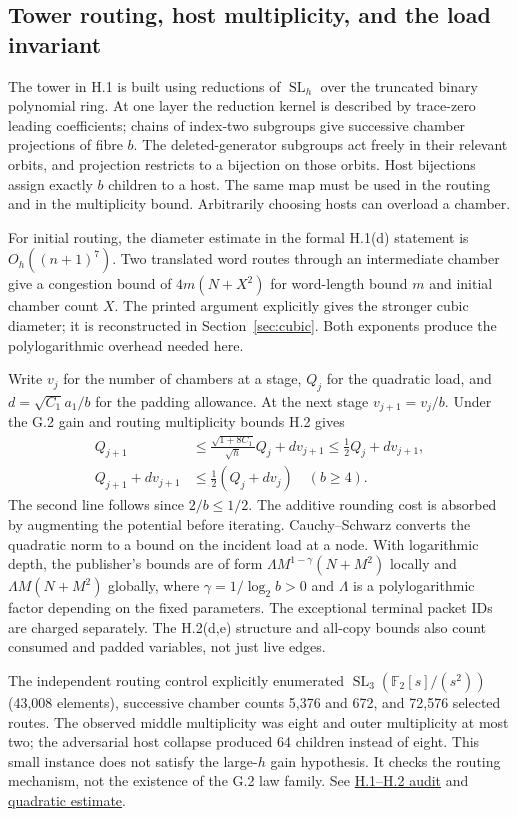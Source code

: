\documentclass[11pt,letterpaper]{article}
\theoremstyle{definition}\newtheorem{definition}[theorem]{Definition}\newtheorem{example}[theorem]{Example}
\theoremstyle{remark}\newtheorem{remark}[theorem]{Remark}
\newcommand{\F}{\mathbb{F}}
\newcommand{\pub}[3]{\href{https://github.com/anthropics/formal-math/blob/11b6c7e3c927df2658f513b6b68ea7f8929c62c5/vp-vnp/#1\#L#2}{#3}}
\newcommand{\aud}[2]{\href{https://github.com/nousentllc/VP-VNP-Review/blob/567303d0bcf4f9d54390437b137752446e58ccd6/#1}{#2}}
\begin{document}
\subsection{Tower routing, host multiplicity, and the load invariant}\label{sec:tower}
The tower in H.1 is built using reductions of $\operatorname{SL}_h$ over the truncated binary polynomial ring. At one layer the reduction kernel is described by trace-zero leading coefficients; chains of index-two subgroups give successive chamber projections of fibre $b$. The deleted-generator subgroups act freely in their relevant orbits, and projection restricts to a bijection on those orbits. Host bijections assign exactly $b$ children to a host. The same map must be used in the routing and in the multiplicity bound. Arbitrarily choosing hosts can overload a chamber.

For initial routing, the diameter estimate in the formal H.1(d) statement is $O_h((n+1)^7)$. Two translated word routes through an intermediate chamber give a congestion bound of $4m(N+X^2)$ for word-length bound $m$ and initial chamber count $X$. The printed argument explicitly gives the stronger cubic diameter; it is reconstructed in Section~\ref{sec:cubic}. Both exponents produce the polylogarithmic overhead needed here.

Write $v_j$ for the number of chambers at a stage, $Q_j$ for the quadratic load, and $d=\sqrt{C_1}a_1/b$ for the padding allowance. At the next stage $v_{j+1}=v_j/b$. Under the G.2 gain and routing multiplicity bounds H.2 gives
\begin{align}
 Q_{j+1}&\le \frac{\sqrt{1+8C_1}}{\sqrt h}Q_j+d v_{j+1}\le\tfrac12Q_j+d v_{j+1},\\
 Q_{j+1}+dv_{j+1}&\le\tfrac12(Q_j+dv_j)\quad(b\ge4).\label{eq:load}
\end{align}
The second line follows since $2/b\le1/2$. The additive rounding cost is absorbed by augmenting the potential before iterating. Cauchy--Schwarz converts the quadratic norm to a bound on the incident load at a node. With logarithmic depth, the publisher's bounds are of form $\Lambda M^{1-\gamma}(N+M^2)$ locally and $\Lambda M(N+M^2)$ globally, where $\gamma=1/\log_2b>0$ and $\Lambda$ is a polylogarithmic factor depending on the fixed parameters. The exceptional terminal packet IDs are charged separately. The H.2(d,e) structure and all-copy bounds also count consumed and padded variables, not just live edges.

The independent routing control explicitly enumerated $\operatorname{SL}_3(\F_2[s]/(s^2))$ (43,008 elements), successive chamber counts 5,376 and 672, and 72,576 selected routes. The observed middle multiplicity was eight and outer multiplicity at most two; the adversarial host collapse produced 64 children instead of eight. This small instance does not satisfy the large-$h$ gain hypothesis. It checks the routing mechanism, not the existence of the G.2 law family. See \aud{passes/14b-tower.md}{H.1--H.2 audit} and \pub{Nc/Tow/Load.lean}{364}{quadratic estimate}.
\end{document}
